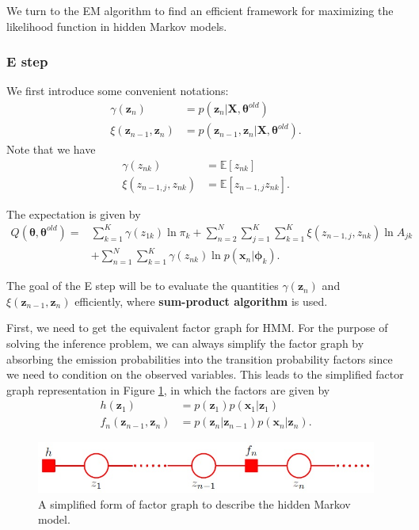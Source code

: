 \documentclass[a4paper]{report}
\renewcommand{\bf}{\mathbf}
\newcommand{\bb}{\mathbb}
\newcommand{\bs}{\boldsymbol}
\begin{document}
We turn to the EM algorithm to find an efficient framework for maximizing the likelihood function in hidden Markov models. 

\subsubsection{E step}
We first introduce some convenient notations:
\begin{align}
	\gamma(\bf{z}_n) &= p(\bf{z}_n|\bf{X},\bs{\theta}^{old}) \\
	\xi(\bf{z}_{n-1},\bf{z}_n) &= p(\bf{z}_{n-1},\bf{z}_n|\bf{X},\bs{\theta}^{old}).
\end{align}
Note that we have
\begin{align}
	\gamma(z_{nk}) &= \bb{E}[z_{nk}] \\
	\xi(z_{n-1,j},z_{nk}) &= \bb{E}[z_{n-1,j}z_{nk}].
\end{align}

The expectation is given by
\begin{align}
	Q(\bs{\theta,\theta}^{old}) = &\sum_{k=1}^K \gamma(z_{1k}) \ln \pi_k +\sum_{n=2}^N \sum_{j=1}^K \sum_{k=1}^K \xi(z_{n-1,j},z_{nk})\ln A_{jk} \\
	&+\sum_{n=1}^N \sum_{k=1}^K \gamma(z_{nk}) \ln p(\bf{x}_n|\bs{\phi}_k).
\end{align}

The goal of the E step will be to evaluate the quantities $\gamma(\bf{z}_n)$ and $\xi(\bf{z}_{n-1},\bf{z}_n)$ efficiently, where \textbf{sum-product algorithm} is used.

First, we need to get the equivalent factor graph for HMM. For the purpose of solving the inference problem, we can always simplify the factor graph by absorbing the emission probabilities into the transition probability factors since we need to condition on the observed variables. This leads to the simplified factor graph representation in Figure \ref{HMMFG}, in which the factors are given by
\begin{align}
	h(\bf{z}_1) &= p(\bf{z}_1)p(\bf{x}_1|\bf{z}_1) \\
	f_n(\bf{z}_{n-1},\bf{z}_n) &= p(\bf{z}_n|\bf{z}_{n-1})p(\bf{x}_n|\bf{z}_n).
\end{align}
\begin{figure}
	\centering
	\includegraphics[scale=.5]{HMMFG}
	\caption{A simplified form of factor graph to describe the hidden Markov model.} \label{HMMFG}
\end{figure}
\end{document}
